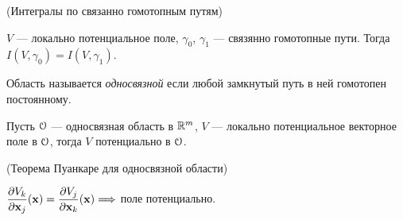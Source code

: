 \begin{theorem}(Интегралы по связанно гомотопным путям)

    $V$ --- локально потенциальное поле, $\gamma_0$, $\gamma_1$ --- связянно
    гомотопные пути. Тогда $I(V, \gamma_0) = I(V, \gamma_1)$.
\end{theorem}

\begin{definition}
    Область называется \textit{односвязной} если любой замкнутый путь в ней
    гомотопен постоянному.
\end{definition}

\begin{theorem}

    Пусть $\mathcal{O}$ --- односвязная область в $\mathbb{R}^m$, $V$ --- локально потенциальное
    векторное поле в $\mathcal{O}$, тогда $V$ потенциально в $\mathcal{O}$.
\end{theorem}

\begin{corollary}(Теорема Пуанкаре для односвязной области)

    $\dfrac{\partial V_k}{\partial \mathbf{x}_j}(\mathbf{x}) = \dfrac{\partial V_j}{\partial \mathbf{x}_k}(\mathbf{x}) \Longrightarrow$ поле потенциально.
\end{corollary}

